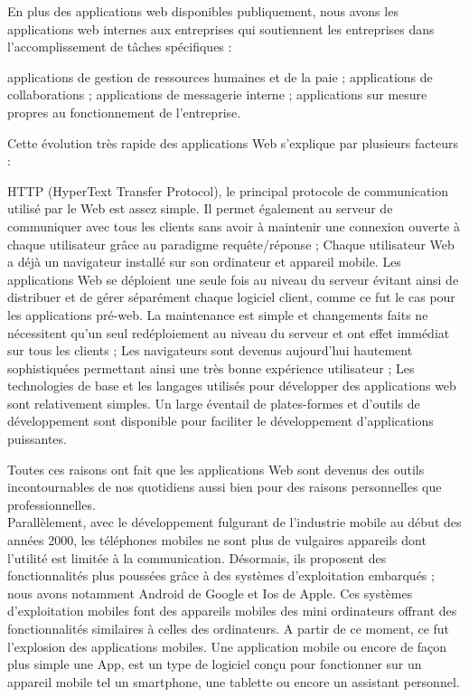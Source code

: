 En plus des applications web disponibles publiquement, nous avons les applications web internes aux entreprises qui soutiennent les entreprises dans l’accomplissement de tâches spécifiques :
\begin{itemize}
	\itemtirait applications de gestion de ressources humaines et de la paie ;
	\itemtirait applications de collaborations ;
	\itemtirait applications de messagerie interne ;
	\itemtirait applications sur mesure propres au fonctionnement de l’entreprise.
\end{itemize}
Cette évolution très rapide des applications Web s'explique par plusieurs facteurs :
\begin{itemize}
	\itemcheck HTTP (HyperText Transfer Protocol), le principal protocole de communication utilisé par le Web est assez simple. Il permet également au serveur de communiquer avec tous les clients sans avoir à maintenir une connexion ouverte à chaque utilisateur grâce au paradigme requête/réponse ;
	\itemcheck Chaque utilisateur Web a déjà un navigateur installé sur son ordinateur et appareil mobile. Les applications Web se déploient une seule fois au niveau du serveur évitant ainsi de distribuer et de gérer séparément chaque logiciel client, comme ce fut le cas pour les applications pré-web. La maintenance est simple et changements faits ne nécessitent qu'un seul redéploiement au niveau du serveur et ont effet immédiat sur tous les clients ;
	\itemcheck Les navigateurs sont devenus aujourd'hui hautement sophistiquées permettant ainsi une très bonne expérience utilisateur ;
	\itemcheck Les technologies de base et les langages utilisés pour développer des applications web sont relativement simples. Un large éventail de plates-formes et d'outils de développement sont disponible pour faciliter le développement d'applications puissantes.
\end{itemize}
Toutes ces raisons ont fait que les applications Web sont devenus des outils incontournables de nos quotidiens aussi bien pour des raisons personnelles que professionnelles.\\
Parallèlement, avec le développement fulgurant de l'industrie mobile au début des années 2000, les téléphones mobiles ne sont plus de vulgaires appareils dont l'utilité est limitée à la communication. Désormais, ils proposent des fonctionnalités plus poussées grâce à des systèmes d'exploitation embarqués ; nous avons notamment Android de Google et Ios de Apple. Ces systèmes d'exploitation mobiles font des appareils mobiles des mini ordinateurs offrant des fonctionnalités similaires à celles des ordinateurs. A partir de ce moment, ce fut l'explosion des applications mobiles. Une application mobile ou encore de façon plus simple une App, est un type de logiciel conçu pour fonctionner sur un appareil mobile tel un smartphone, une tablette ou encore un assistant personnel. \\
